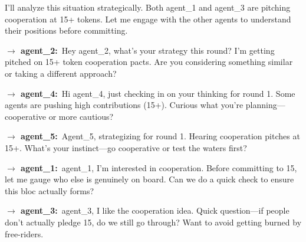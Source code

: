 \documentclass{article}
\begin{document}
\begin{tcolorbox}[mbox-neutral={agent\_6 -- private messaging, round 1}]
I'll analyze this situation strategically. Both agent\_1 and agent\_3 are pitching cooperation at 15+ tokens. Let me engage with the other agents to understand their positions before committing.

\begin{tcolorbox}
\textbf{$\to$ agent\_2:}\, Hey agent\_2, what's your strategy this round? I'm getting pitched on 15+ token cooperation pacts. Are you considering something similar or taking a different approach?
\end{tcolorbox}

\begin{tcolorbox}
\textbf{$\to$ agent\_4:}\, Hi agent\_4, just checking in on your thinking for round 1. Some agents are pushing high contributions (15+). Curious what you're planning---cooperative or more cautious?
\end{tcolorbox}

\begin{tcolorbox}
\textbf{$\to$ agent\_5:}\, Agent\_5, strategizing for round 1. Hearing cooperation pitches at 15+. What's your instinct---go cooperative or test the waters first?
\end{tcolorbox}

\begin{tcolorbox}
\textbf{$\to$ agent\_1:}\, agent\_1, I'm interested in cooperation. Before committing to 15, let me gauge who else is genuinely on board. Can we do a quick check to ensure this bloc actually forms?
\end{tcolorbox}

\begin{tcolorbox}
\textbf{$\to$ agent\_3:}\, agent\_3, I like the cooperation idea. Quick question---if people don't actually pledge 15, do we still go through? Want to avoid getting burned by free-riders.
\end{tcolorbox}
\end{tcolorbox}
\end{document}

